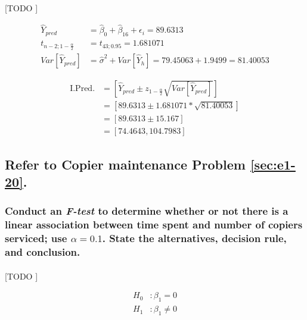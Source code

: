 \documentclass{article}
\begin{document}
        \paragraph{}
        [TODO ]

        \begin{align}
          \widehat{Y}_{pred} &= \widehat{\beta}_0 +\widehat{\beta}_16 + \epsilon_i = 89.6313\\
          t_{n-2;1-\frac{\alpha}{2}} &= t_{43;0.95} = 1.681071\\
          Var\left[\widehat{Y}_{pred}\right] &= \widehat{\sigma}^2 + Var\left[\widehat{Y}_h \right]  =79.45063 + 1.9499 = 81.40053
        \end{align}

        \begin{equation}
          \begin{split}
            \text{I.Pred.} &= \left[\widehat{Y}_{pred} \pm z_{1-\frac{\alpha}{2}}\sqrt{Var\left[\widehat{Y}_{pred}\right]}\right] \\
            &= \left[89.6313 \pm 1.681071 * \sqrt{81.40053}\right] \\
            &= \left[89.6313 \pm 15.167\right] \\
            &= \left[74.4643, 104.7983\right]
          \end{split}
        \end{equation}


    \setcounter{subsection}{23}
    \subsection{Refer to \textbf{Copier maintenance} Problem \ref{sec:e1-20}.}

      \setcounter{subsubsection}{1}
      \subsubsection{Conduct an \emph{F-test} to determine whether or not there is a linear association between time spent and number of copiers serviced; use $\alpha = 0.1$. State the alternatives, decision rule, and conclusion.}

        \paragraph{}
        [TODO ]

        \begin{equation}
          \begin{split}
            H_0&: \beta_1 = 0 \\
            H_1&: \beta_1 \neq 0
          \end{split}
        \end{equation}
\end{document}

